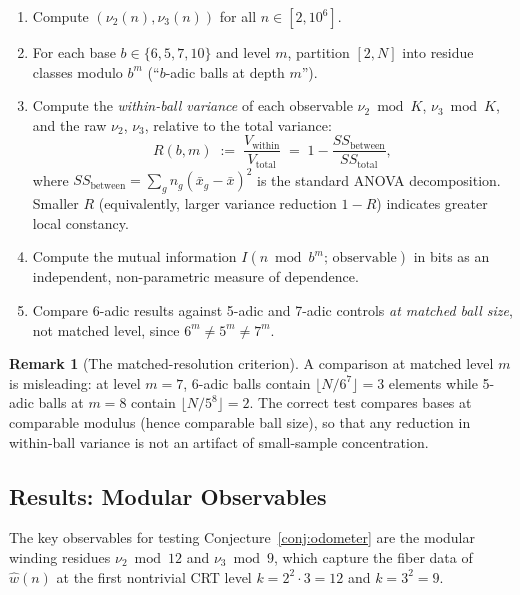 \documentclass[11pt,a4paper]{article}
\theoremstyle{plain}
\theoremstyle{definition}
\newtheorem{remark}[theorem]{Remark}
\begin{document}
\begin{enumerate}
    \item Compute $(\nu_2(n), \nu_3(n))$ for all $n \in [2, 10^6]$.
    \item For each base $b \in \{6, 5, 7, 10\}$ and level $m$,
          partition $[2, N]$ into residue classes modulo $b^m$
          (``$b$-adic balls at depth $m$'').
    \item Compute the \emph{within-ball variance} of each observable
          $\nu_2 \bmod K$, $\nu_3 \bmod K$, and the raw
          $\nu_2$, $\nu_3$, relative to the total variance:
          \begin{equation}\label{eq:varratio}
              R(b, m) \;:=\; \frac{V_{\mathrm{within}}}{V_{\mathrm{total}}}
              \;=\; 1 - \frac{SS_{\mathrm{between}}}{SS_{\mathrm{total}}},
          \end{equation}
          where $SS_{\mathrm{between}} = \sum_g n_g
          (\bar{x}_g - \bar{x})^2$ is the standard ANOVA decomposition.
          Smaller $R$ (equivalently, larger variance reduction
          $1 - R$) indicates greater local constancy.
    \item Compute the mutual information $I(n \bmod b^m;\, \text{observable})$
          in bits as an independent, non-parametric measure of dependence.
    \item Compare 6-adic results against 5-adic and 7-adic controls
          \emph{at matched ball size}, not matched level, since
          $6^m \neq 5^m \neq 7^m$.
\end{enumerate}

\begin{remark}[The matched-resolution criterion]
    A comparison at matched level $m$ is misleading: at level $m = 7$,
    6-adic balls contain $\lfloor N / 6^7 \rfloor = 3$ elements while
    5-adic balls at $m = 8$ contain $\lfloor N / 5^8 \rfloor = 2$.
    The correct test compares bases at comparable modulus (hence
    comparable ball size), so that any reduction in within-ball
    variance is not an artifact of small-sample concentration.
\end{remark}


\subsection{Results: Modular Observables}

The key observables for testing Conjecture~\ref{conj:odometer} are the
modular winding residues $\nu_2 \bmod 12$ and $\nu_3 \bmod 9$, which
capture the fiber data of $\hat{w}(n)$ at the first nontrivial CRT
level $k = 2^2 \cdot 3 = 12$ and $k = 3^2 = 9$.
\end{document}
